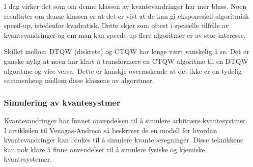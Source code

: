         I dag virker det som om denne klassen av kvantevandringer har mer bluss. Noen resultater om denne klassen er at det er vist at de kan gi eksponesiell algoritmisk speed-up, istedenfor kvadratisk. Dette skjer som oftest i spesielle tilfelle av kvantevandringer og om man kan speede-up flere algoritmer er av stor interesse.
        
        Skillet mellom DTQW (diskrete) og CTQW har lenge vært vanskelig å se. Det er ganske nylig at noen har klart å transformere en CTQW algoritme til en DTQW algoritme og vice versa. Dette er kanskje overraskende at det ikke er en tydelig sammenheng mellom disse klassene av algoritmer.
        
    \subsubsection*{Simulering av kvantesystmer}
    
        Kvantevandringer har funnet anvendelsen til å simulere arbitrære kvantesystmer. I artikkelen til Venagas-Andreca \cite{Venegas_Andraca_2012} så beskriver de en modell for hvordan kvantevandringer kan brukes til å simulere kvanteberegninger. Disse teknikkene kan nok klare å finne anvendelser til å simulere fysiske og kjemiske kvantesystemer.